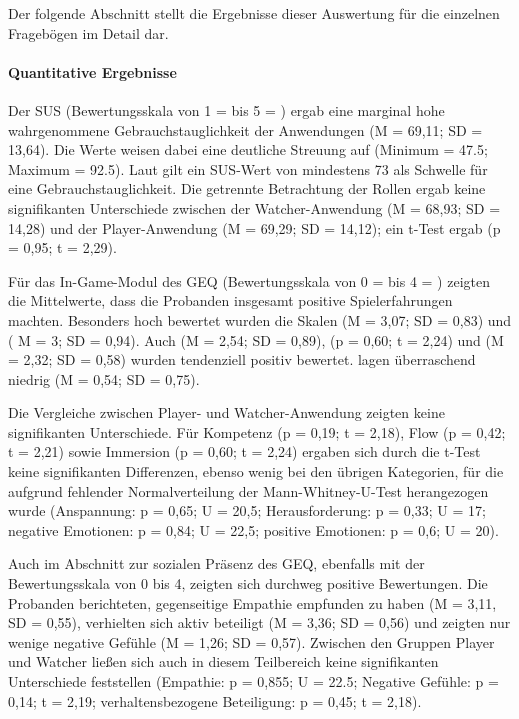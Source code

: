 Der folgende Abschnitt stellt die Ergebnisse dieser Auswertung für die einzelnen Fragebögen im Detail dar.

\paragraph{Quantitative Ergebnisse}

Der \ac{SUS} (Bewertungsskala von 1 =  bis 5 = ) ergab eine marginal hohe wahrgenommene Gebrauchstauglichkeit der Anwendungen (M = 69,11; SD = 13,64). Die Werte weisen dabei eine deutliche Streuung auf (Minimum = 47.5; Maximum = 92.5). Laut \citep[S. 36]{brooke_sus_2013} gilt ein \ac{SUS}-Wert von mindestens 73 als Schwelle für eine  Gebrauchstauglichkeit. Die getrennte Betrachtung der Rollen ergab keine signifikanten Unterschiede zwischen der Watcher-Anwendung (M = 68,93; SD = 14,28) und der Player-Anwendung (M = 69,29; SD = 14,12); ein t-Test ergab  (p = 0,95; t = 2,29).

Für das In-Game-Modul des \ac{GEQ} (Bewertungsskala von 0 =  bis 4 = ) zeigten die Mittelwerte, dass die Probanden insgesamt positive Spielerfahrungen machten. Besonders hoch bewertet wurden die Skalen  (M = 3,07; SD = 0,83) und  ( M = 3; SD = 0,94). Auch  (M = 2,54; SD = 0,89),  (p = 0,60; t = 2,24) und  (M = 2,32; SD = 0,58) wurden tendenziell positiv bewertet.  lagen überraschend niedrig (M = 0,54; SD = 0,75).

Die Vergleiche zwischen Player- und Watcher-Anwendung zeigten keine signifikanten Unterschiede. Für Kompetenz (p = 0,19; t = 2,18), Flow (p = 0,42; t = 2,21) sowie Immersion (p = 0,60; t = 2,24) ergaben sich durch die t-Test keine signifikanten Differenzen, ebenso wenig bei den übrigen Kategorien, für die aufgrund fehlender Normalverteilung der Mann-Whitney-U-Test herangezogen wurde (Anspannung: p = 0,65; U = 20,5; Herausforderung: p = 0,33; U = 17; negative Emotionen: p = 0,84; U = 22,5; positive Emotionen: p = 0,6; U = 20).

Auch im Abschnitt zur sozialen Präsenz des \ac{GEQ}, ebenfalls mit der Bewertungsskala von 0 bis 4, zeigten sich durchweg positive Bewertungen. Die Probanden berichteten, gegenseitige Empathie empfunden zu haben (M = 3,11, SD = 0,55), verhielten sich aktiv beteiligt (M = 3,36; SD = 0,56) und zeigten nur wenige negative Gefühle (M = 1,26; SD = 0,57). Zwischen den Gruppen Player und Watcher ließen sich auch in diesem Teilbereich keine signifikanten Unterschiede feststellen (Empathie: p = 0,855; U = 22.5; Negative Gefühle: p = 0,14; t = 2,19; verhaltensbezogene Beteiligung: p = 0,45; t = 2,18).

